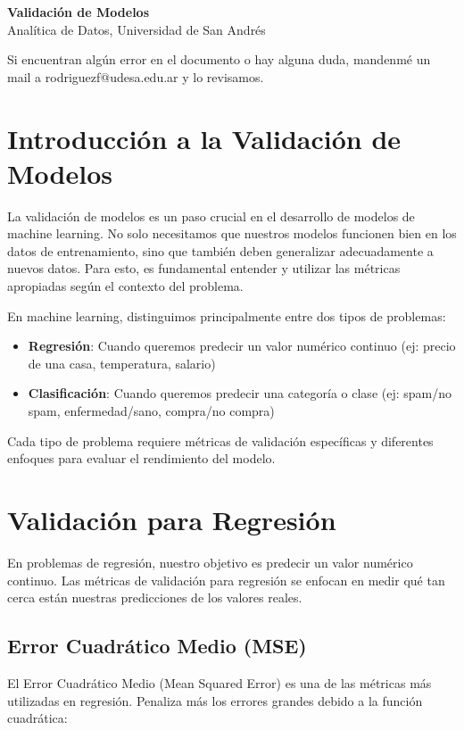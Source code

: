 \documentclass[12pt]{article}
\begin{document}
\begin{center}
  {\LARGE \textbf{Validación de Modelos}}\\[0.5em]
  {Analítica de Datos, Universidad de San Andrés}
\end{center}

Si encuentran algún error en el documento o hay alguna duda, mandenmé un mail a rodriguezf@udesa.edu.ar y lo revisamos.

\section{Introducción a la Validación de Modelos}
La validación de modelos es un paso crucial en el desarrollo de modelos de machine learning. No solo necesitamos que nuestros modelos funcionen bien en los datos de entrenamiento, sino que también deben generalizar adecuadamente a nuevos datos. Para esto, es fundamental entender y utilizar las métricas apropiadas según el contexto del problema.

En machine learning, distinguimos principalmente entre dos tipos de problemas:
\begin{itemize}
    \item \textbf{Regresión}: Cuando queremos predecir un valor numérico continuo (ej: precio de una casa, temperatura, salario)
    \item \textbf{Clasificación}: Cuando queremos predecir una categoría o clase (ej: spam/no spam, enfermedad/sano, compra/no compra)
\end{itemize}

Cada tipo de problema requiere métricas de validación específicas y diferentes enfoques para evaluar el rendimiento del modelo.

\section{Validación para Regresión}

En problemas de regresión, nuestro objetivo es predecir un valor numérico continuo. Las métricas de validación para regresión se enfocan en medir qué tan cerca están nuestras predicciones de los valores reales.

\subsection{Error Cuadrático Medio (MSE)}

El Error Cuadrático Medio (Mean Squared Error) es una de las métricas más utilizadas en regresión. Penaliza más los errores grandes debido a la función cuadrática:
\end{document}

